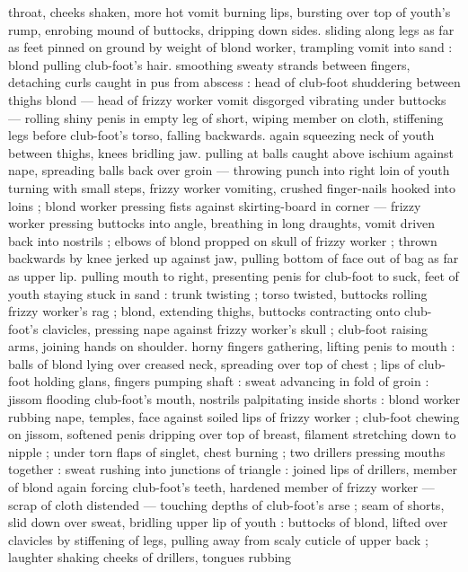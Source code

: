 throat, cheeks shaken, more hot vomit burning lips, bursting over top 
of youth's rump, enrobing mound of buttocks, dripping down sides. 
sliding along legs as far as feet pinned on ground by weight of blond 
worker, trampling vomit into sand : blond pulling club-foot's hair. 
smoothing sweaty strands between fingers, detaching curls caught in 
pus from abscess : head of club-foot shuddering between thighs 
blond --- head of frizzy worker vomit disgorged vibrating under 
buttocks --- rolling shiny penis in empty leg of short, wiping member 
on cloth, stiffening legs before club-foot's torso, falling backwards. 
again squeezing neck of youth between thighs, knees bridling jaw. 
pulling at balls caught above ischium against nape, spreading balls 
back over groin --- throwing punch into right loin of youth turning 
with small steps, frizzy worker vomiting, crushed finger-nails hooked 
into loins ; blond worker pressing fists against skirting-board in 
corner --- frizzy worker pressing buttocks into angle, breathing in 
long draughts, vomit driven back into nostrils ; elbows of blond 
propped on skull of frizzy worker ; thrown backwards by knee jerked 
up against jaw, pulling bottom of face out of bag as far as upper lip. 
pulling mouth to right, presenting penis for club-foot to suck, feet of 
youth staying stuck in sand : trunk twisting ; torso twisted, buttocks 
rolling frizzy worker's rag ; blond, extending thighs, buttocks 
contracting onto club-foot's clavicles, pressing nape against frizzy 
worker's skull ; club-foot raising arms, joining hands on shoulder. 
horny fingers gathering, lifting penis to mouth : balls of blond lying 
over creased neck, spreading over top of chest ; lips of club-foot 
holding glans, fingers pumping shaft : sweat advancing in fold of 
groin : jissom flooding club-foot's mouth, nostrils palpitating inside 
shorts : blond worker rubbing nape, temples, face against soiled lips 
of frizzy worker ; club-foot chewing on jissom, softened penis 
dripping over top of breast, filament stretching down to nipple ; 
under torn flaps of singlet, chest burning ; two drillers pressing 
mouths together : sweat rushing into junctions of triangle : joined 
lips of drillers, member of blond again forcing club-foot's teeth, 
hardened member of frizzy worker --- scrap of cloth distended --- 
touching depths of club-foot's arse ; seam of shorts, slid down over 
sweat, bridling upper lip of youth : buttocks of blond, lifted over 
clavicles by stiffening of legs, pulling away from scaly cuticle of 
upper back ; laughter shaking cheeks of drillers, tongues rubbing 
